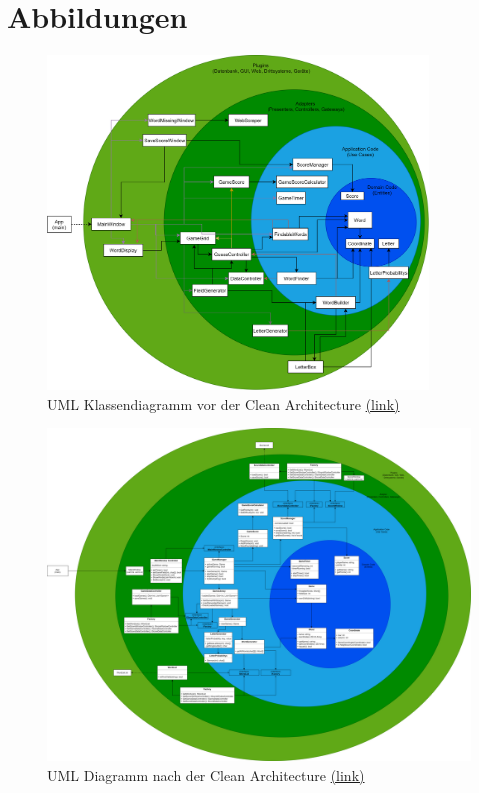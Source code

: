 \chapter{Abbildungen}

\begin{figure}[!ht]
  \centering
  \includegraphics[width=0.9\textwidth]{Bilder/CleanArchitectureBEFORE.PNG}
  \caption[UML Klassendiagramm vor der Clean Architecture]{UML Klassendiagramm vor der Clean Architecture \href{https://github.com/EinToni/WortfinderDoku/blob/main/Bilder/CleanArchitectureBEFORE.png}{(link)}}
  \label{Abb:CleanArchitectureBEFORE}
\end{figure}

\begin{figure}[!ht]
  \centering
  \includegraphics[height=0.78\textheight, angle =90]{Bilder/CleanArchitectureAFTER.PNG}
  \caption[UML Diagramm nach der Clean Architecture]{UML Diagramm nach der Clean Architecture \href{https://github.com/EinToni/WortfinderDoku/blob/main/Bilder/CleanArchitectureAFTER.png}{(link)}}
  \label{Abb:CleanArchitectureAFTER}
\end{figure}

\endinput